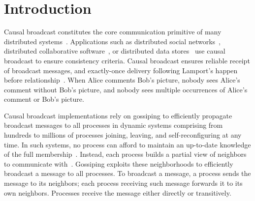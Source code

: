  
\section{Introduction}

Causal broadcast constitutes the core communication primitive of many
distributed systems~\cite{hadzilacos1994modular}. Applications such as
distributed social networks~\cite{borthakur2013petabyte}, distributed
collaborative software~\cite{heinrich2012exploiting,nedelec2016crate}, or
distributed data
stores~\cite{bailis2013bolton,bravo2017saturn,demers1987epidemic,lloyd2011cops,shapiro2011comprehensive}
use causal broadcast to ensure consistency criteria.  Causal broadcast ensures
reliable receipt of broadcast messages, and exactly-once delivery following
Lamport's happen before relationship~\cite{lamport1978time}. When Alice comments
Bob's picture, nobody sees Alice's comment without Bob's picture, and nobody
sees multiple occurrences of Alice's comment or Bob's picture.

Causal broadcast implementations rely on gossiping to efficiently propagate
broadcast messages to all processes in dynamic systems comprising from hundreds
to millions of processes joining, leaving, and self-reconfiguring at any
time. In such systems, no process can afford to maintain an up-to-date knowledge
of the full membership~\cite{birman1999bimodal,demers1987epidemic}. Instead,
each process builds a partial view of neighbors to communicate
with~\cite{jelasity2007gossip}. Gossiping exploits these neighborhoods to
efficiently broadcast a message to all processes. To broadcast a message, a
process sends the message to its neighbors; each process receiving such message
forwards it to its own neighbors. Processes receive the message either directly
or transitively.



